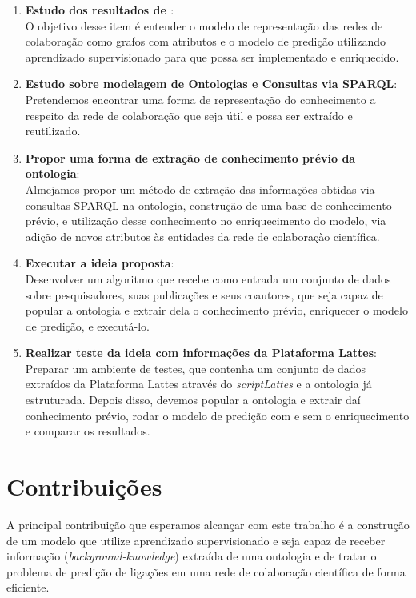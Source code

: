 \begin{enumerate}
    \item \textbf{Estudo dos resultados de \citet{Cervantes2014}}: \\
      O objetivo desse item é entender o modelo de representação das redes de colaboração como grafos com atributos e o modelo de predição utilizando aprendizado supervisionado para que possa ser implementado e enriquecido.
    \item \textbf{Estudo sobre modelagem de Ontologias e Consultas via SPARQL}: \\
      Pretendemos encontrar uma forma de representação do conhecimento a respeito da rede de colaboração que seja útil e possa ser extraído e reutilizado.
    \item \textbf{Propor uma forma de extração de conhecimento prévio da ontologia}: \\
      Almejamos propor um método de extração das informações obtidas via consultas SPARQL na ontologia, construção de uma base de conhecimento prévio, e utilização desse conhecimento no enriquecimento do modelo, via adição de novos atributos às entidades da rede de colaboraçào científica.
    \item \textbf{Executar a ideia proposta}: \\
      Desenvolver um algoritmo que recebe como entrada um conjunto de dados sobre pesquisadores, suas publicações e seus coautores, que seja capaz de popular a ontologia e extrair dela o conhecimento prévio, enriquecer o modelo de predição, e executá-lo. %
    \item \textbf{Realizar teste da ideia com informações da Plataforma Lattes}: \\
      Preparar um ambiente de testes, que contenha um conjunto de dados extraídos da Plataforma Lattes através do \textit{scriptLattes} e a ontologia já estruturada. Depois disso, devemos popular a ontologia e extrair daí conhecimento prévio, rodar o modelo de predição com e sem o enriquecimento e comparar os resultados.
\end{enumerate}

\section{Contribuições}
\label{sec:contribucoes}

A principal contribuição que esperamos alcançar com este trabalho é a construção de um modelo que utilize aprendizado supervisionado e seja capaz de receber informação (\textit{background-knowledge}) extraída de uma ontologia e de tratar o problema de predição de ligações em uma rede de colaboração científica de forma eficiente.

